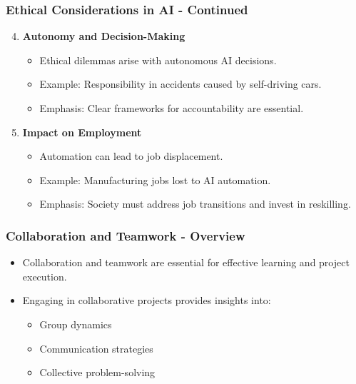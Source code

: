 \documentclass[aspectratio=169]{beamer}
\begin{document}
\begin{frame}[fragile]
    \frametitle{Ethical Considerations in AI - Continued}
    \begin{enumerate}
        \setcounter{enumi}{3} %
        \item \textbf{Autonomy and Decision-Making}
            \begin{itemize}
                \item Ethical dilemmas arise with autonomous AI decisions.
                \item Example: Responsibility in accidents caused by self-driving cars.
                \item Emphasis: Clear frameworks for accountability are essential.
            \end{itemize}

        \item \textbf{Impact on Employment}
            \begin{itemize}
                \item Automation can lead to job displacement.
                \item Example: Manufacturing jobs lost to AI automation.
                \item Emphasis: Society must address job transitions and invest in reskilling.
            \end{itemize}
    \end{enumerate}
\end{frame}

\begin{frame}[fragile]
    \frametitle{Collaboration and Teamwork - Overview}
    \begin{itemize}
        \item Collaboration and teamwork are essential for effective learning and project execution.
        \item Engaging in collaborative projects provides insights into:
        \begin{itemize}
            \item Group dynamics
            \item Communication strategies
            \item Collective problem-solving
        \end{itemize}
    \end{itemize}
\end{frame}
\end{document}
